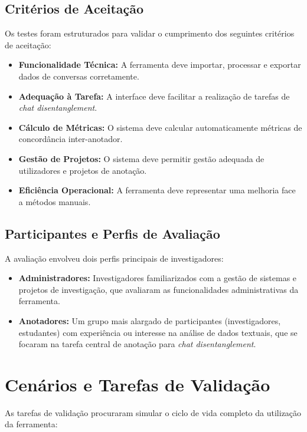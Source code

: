 \subsection{Critérios de Aceitação}
Os testes foram estruturados para validar o cumprimento dos seguintes critérios de aceitação:
\begin{itemize}
    \item \textbf{Funcionalidade Técnica:} A ferramenta deve importar, processar e exportar dados de conversas corretamente.
    \item \textbf{Adequação à Tarefa:} A interface deve facilitar a realização de tarefas de \textit{chat disentanglement}.
    \item \textbf{Cálculo de Métricas:} O sistema deve calcular automaticamente métricas de concordância inter-anotador.
    \item \textbf{Gestão de Projetos:} O sistema deve permitir gestão adequada de utilizadores e projetos de anotação.
    \item \textbf{Eficiência Operacional:} A ferramenta deve representar uma melhoria face a métodos manuais.
\end{itemize}

\subsection{Participantes e Perfis de Avaliação}
A avaliação envolveu dois perfis principais de investigadores:
\begin{itemize}
    \item \textbf{Administradores:} Investigadores familiarizados com a gestão de sistemas e projetos de investigação, que avaliaram as funcionalidades administrativas da ferramenta.
    \item \textbf{Anotadores:} Um grupo mais alargado de participantes (investigadores, estudantes) com experiência ou interesse na análise de dados textuais, que se focaram na tarefa central de anotação para \textit{chat disentanglement}.
\end{itemize}

\section{Cenários e Tarefas de Validação}

As tarefas de validação procuraram simular o ciclo de vida completo da utilização da ferramenta:

